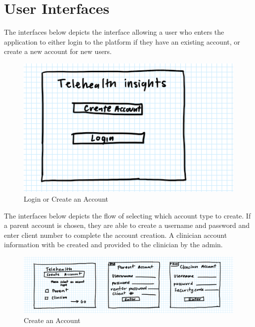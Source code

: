 \documentclass[12pt, titlepage]{article}
\begin{document}

\section{User Interfaces}


\hspace{1.5em}The interfaces below depicts the interface allowing a user who enters the application to either login to the platform if they have an existing account, or create a new account for new users.
\begin{figure}[H]
  \centering
  \includegraphics[scale=0.9]{images/createORlogin.png}
  \caption{Login or Create an Account}
\end{figure}

\hspace{1.5em}The interfaces below depicts the flow of selecting which account type to create. If a parent account is chosen, they are able to create a username and password and enter client number to complete the account creation. A clinician account information with be created and provided to the clinician by the admin.
\begin{figure}[H]
  \centering
  \includegraphics[scale=0.9]{images/create account.png}
  \caption{Create an Account}
\end{figure}
\end{document}
